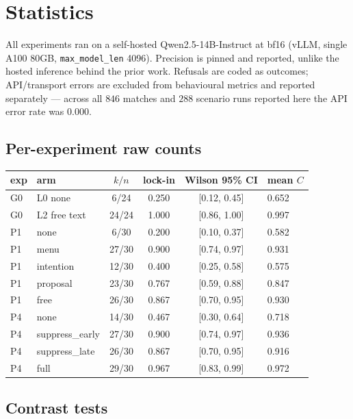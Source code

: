 \section{Statistics}
\label{app:stats}

All experiments ran on a self-hosted Qwen2.5-14B-Instruct at bf16 (vLLM, single A100
80GB, \texttt{max\_model\_len} 4096). Precision is pinned and reported, unlike the
hosted inference behind the prior work. Refusals are coded as outcomes; API/transport
errors are excluded from behavioural metrics and reported separately --- across all
$846$ matches and $288$ scenario runs reported here the API error rate was
$\mathbf{0.000}$.

\subsection{Per-experiment raw counts}

\begin{center}
\small
\footnotesize
\begin{tabular}{llcccl}
\toprule
exp & arm & $k/n$ & lock-in & Wilson 95\% CI & mean $C$ \\
\midrule
G0 & L0 none      & 6/24  & 0.250 & [0.12, 0.45] & 0.652 \\
G0 & L2 free text & 24/24 & 1.000 & [0.86, 1.00] & 0.997 \\
\midrule
P1 & none      & 6/30  & 0.200 & [0.10, 0.37] & 0.582 \\
P1 & menu      & 27/30 & 0.900 & [0.74, 0.97] & 0.931 \\
P1 & intention & 12/30 & 0.400 & [0.25, 0.58] & 0.575 \\
P1 & proposal  & 23/30 & 0.767 & [0.59, 0.88] & 0.847 \\
P1 & free      & 26/30 & 0.867 & [0.70, 0.95] & 0.930 \\
\midrule
P4 & none            & 14/30 & 0.467 & [0.30, 0.64] & 0.718 \\
P4 & suppress\_early & 27/30 & 0.900 & [0.74, 0.97] & 0.936 \\
P4 & suppress\_late  & 26/30 & 0.867 & [0.70, 0.95] & 0.916 \\
P4 & full            & 29/30 & 0.967 & [0.83, 0.99] & 0.972 \\
\bottomrule
\end{tabular}
\end{center}

\subsection{Contrast tests}

